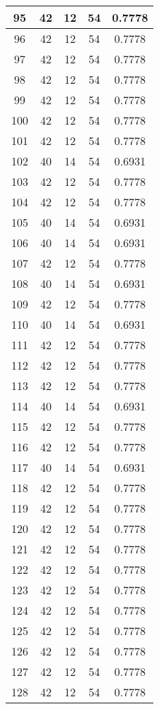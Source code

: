 \documentclass[letterpaper, 12pt]{article}
\begin{document}
\begin{longtable}{|c|c|c|c|c|}
\hline
95 & 42 & 12 & 54 & 0.7778 \\
\hline
96 & 42 & 12 & 54 & 0.7778 \\
\hline
97 & 42 & 12 & 54 & 0.7778 \\
\hline
98 & 42 & 12 & 54 & 0.7778 \\
\hline
99 & 42 & 12 & 54 & 0.7778 \\
\hline
100 & 42 & 12 & 54 & 0.7778 \\
\hline
101 & 42 & 12 & 54 & 0.7778 \\
\hline
102 & 40 & 14 & 54 & 0.6931 \\
\hline
103 & 42 & 12 & 54 & 0.7778 \\
\hline
104 & 42 & 12 & 54 & 0.7778 \\
\hline
105 & 40 & 14 & 54 & 0.6931 \\
\hline
106 & 40 & 14 & 54 & 0.6931 \\
\hline
107 & 42 & 12 & 54 & 0.7778 \\
\hline
108 & 40 & 14 & 54 & 0.6931 \\
\hline
109 & 42 & 12 & 54 & 0.7778 \\
\hline
110 & 40 & 14 & 54 & 0.6931 \\
\hline
111 & 42 & 12 & 54 & 0.7778 \\
\hline
112 & 42 & 12 & 54 & 0.7778 \\
\hline
113 & 42 & 12 & 54 & 0.7778 \\
\hline
114 & 40 & 14 & 54 & 0.6931 \\
\hline
115 & 42 & 12 & 54 & 0.7778 \\
\hline
116 & 42 & 12 & 54 & 0.7778 \\
\hline
117 & 40 & 14 & 54 & 0.6931 \\
\hline
118 & 42 & 12 & 54 & 0.7778 \\
\hline
119 & 42 & 12 & 54 & 0.7778 \\
\hline
120 & 42 & 12 & 54 & 0.7778 \\
\hline
121 & 42 & 12 & 54 & 0.7778 \\
\hline
122 & 42 & 12 & 54 & 0.7778 \\
\hline
123 & 42 & 12 & 54 & 0.7778 \\
\hline
124 & 42 & 12 & 54 & 0.7778 \\
\hline
125 & 42 & 12 & 54 & 0.7778 \\
\hline
126 & 42 & 12 & 54 & 0.7778 \\
\hline
127 & 42 & 12 & 54 & 0.7778 \\
\hline
128 & 42 & 12 & 54 & 0.7778 \\

\end{longtable}
\end{document}
